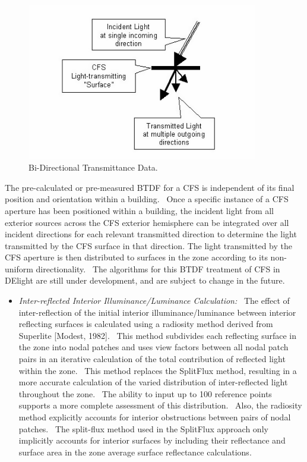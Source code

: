\begin{figure}[hbtp] %
\centering
\includegraphics[width=0.9\textwidth, height=0.9\textheight, keepaspectratio=true]{media/image827.png}
\caption{Bi-Directional Transmittance Data. \protect \label{fig:bi-directional-transmittance-data.}}
\end{figure}

The pre-calculated or pre-measured BTDF for a CFS is independent of its final position and orientation within a building.~ Once a specific instance of a CFS aperture has been positioned within a building, the incident light from all exterior sources across the CFS exterior hemisphere can be integrated over all incident directions for each relevant transmitted direction to determine the light transmitted by the CFS surface in that direction. The light transmitted by the CFS aperture is then distributed to surfaces in the zone according to its non-uniform directionality.~ The algorithms for this BTDF treatment of CFS in DElight are still under development, and are subject to change in the future.

\begin{itemize}
\tightlist
\item
  \emph{Inter-reflected Interior Illuminance/Luminance Calculation:}~ The effect of inter-reflection of the initial interior illuminance/luminance between interior reflecting surfaces is calculated using a radiosity method derived from Superlite {[}Modest, 1982{]}.~ This method subdivides each reflecting surface in the zone into nodal patches and uses view factors between all nodal patch pairs in an iterative calculation of the total contribution of reflected light within the zone.~ This method replaces the SplitFlux method, resulting in a more accurate calculation of the varied distribution of inter-reflected light throughout the zone.~ The ability to input up to 100 reference points supports a more complete assessment of this distribution.~ Also, the radiosity method explicitly accounts for interior obstructions between pairs of nodal patches.~ The split-flux method used in the SplitFlux approach only implicitly accounts for interior surfaces by including their reflectance and surface area in the zone average surface reflectance calculations.
\end{itemize}

